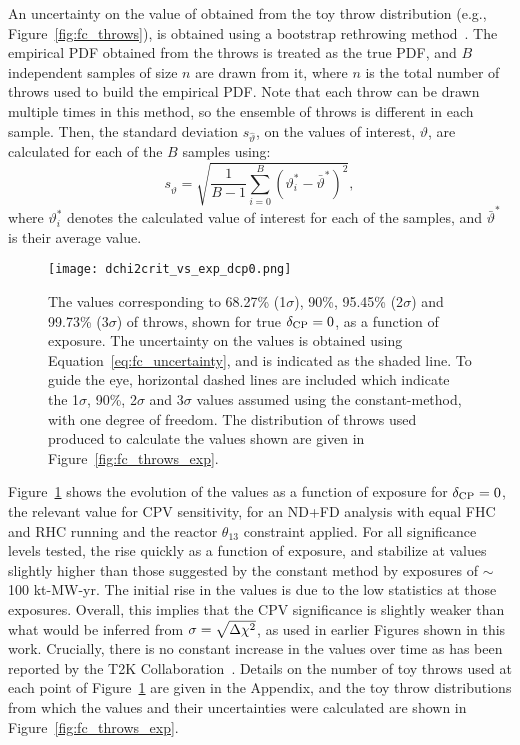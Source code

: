 An uncertainty on the value of \dchisqcrit obtained from the toy throw distribution (e.g., Figure~\ref{fig:fc_throws}), is obtained using a bootstrap rethrowing method~\cite{rice2006mathematical}. The empirical PDF obtained from the throws is treated as the true PDF, and $B$ independent samples of size $n$ are drawn from it, where $n$ is the total number of throws used to build the empirical PDF. Note that each throw can be drawn multiple times in this method, so the ensemble of throws is different in each sample. Then, the standard deviation $s_{\hat{\vartheta}}$, on the \dchisqcrit values of interest, $\vartheta$, are calculated for each of the $B$ samples using:
\begin{equation}
  s_{\hat{\vartheta}} = \sqrt{\frac{1}{B-1} \sum^{B}_{i=0} (\vartheta_{i}^{*} - \bar{\vartheta}^{*})^{2}},
  \label{eq:fc_uncertainty}
\end{equation}
where $\vartheta_{i}^{*}$ denotes the calculated \dchisqcrit value of interest for each of the samples, and $\bar{\vartheta}^{*}$ is their average value.

\begin{figure}[htbp]
  \centering
  \texttt{[image: dchi2crit\_vs\_exp\_dcp0.png]}
  \caption{The \dchisqcrit values corresponding to 68.27\% (1$\sigma$), 90\%, 95.45\% (2$\sigma$) and 99.73\% (3$\sigma$) of throws, shown for true $\delta_{\rm CP} = 0$, as a function of exposure. The uncertainty on the \dchisqcrit values is obtained using Equation~\ref{eq:fc_uncertainty}, and is indicated as the shaded line. To guide the eye, horizontal dashed lines are included which indicate the 1$\sigma$, 90\%, 2$\sigma$ and 3$\sigma$ \dchisq values assumed using the constant-\dchisq method, with one degree of freedom. The distribution of throws used produced to calculate the \dchisqcrit values shown are given in Figure~\ref{fig:fc_throws_exp}.}
  \label{fig:fc_vs_exp}
\end{figure}
Figure~\ref{fig:fc_vs_exp} shows the evolution of the \dchisqcrit values as a function of exposure for $\delta_{\rm CP} = 0$, the relevant value for CPV sensitivity, for an ND+FD analysis with equal FHC and RHC running and the reactor $\theta_{13}$ constraint applied.
For all significance levels tested, the \dchisqcrit rise quickly as a function of exposure, and stabilize at values slightly higher than those suggested by the constant \dchisq method by exposures of $\sim$100 kt-MW-yr. The initial rise in the \dchisqcrit values is due to the low statistics at those exposures. Overall, this implies that the CPV significance is slightly weaker than what would be inferred from $\sigma = \sqrt{\Delta\chi^{2}}$, as used in earlier Figures shown in this work. Crucially, there is no constant increase in the \dchisqcrit values over time as has been reported by the T2K Collaboration~\cite{Abe:2021gky}. Details on the number of toy throws used at each point of Figure~\ref{fig:fc_vs_exp} are given in the Appendix, and the toy throw distributions from which the \dchisqcrit values and their uncertainties were calculated are shown in Figure~\ref{fig:fc_throws_exp}.

